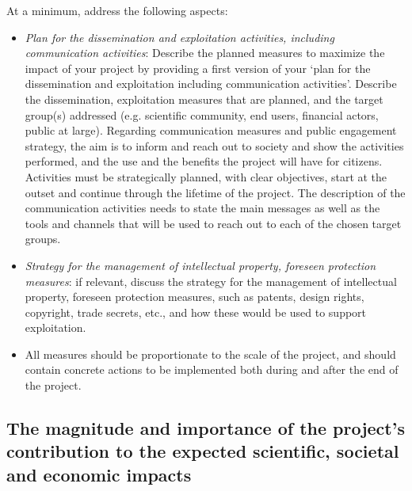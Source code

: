 \documentclass[12pt,draftproposal]{msca-pf}
\begin{document}
At a minimum, address the following aspects:

\begin{itemize}
    \item \emph{Plan for the dissemination and exploitation activities, including
    communication activities}\footnotemark{}: Describe the planned measures to
    maximize the impact of your project by providing a first version of your ‘plan
    for the dissemination and exploitation including communication activities’.
    Describe the dissemination, exploitation measures that are planned, and the target
    group(s) addressed (e.g. scientific community, end users, financial actors,
    public at large). Regarding communication measures and public engagement
    strategy, the aim is to inform and reach out to society and show the activities
    performed, and the use and the benefits the project will have for citizens.
    Activities must be strategically planned, with clear objectives, start at the
    outset and continue through the lifetime of the project. The description of
    the communication activities needs to state the main messages as well as the
    tools and channels that will be used to reach out to each of the chosen target
    groups.


    \item \emph{Strategy for the management of intellectual property, foreseen
    protection measures}: if relevant, discuss the strategy for the management
    of intellectual property, foreseen protection measures, such as patents,
    design rights, copyright, trade secrets, etc., and how these would be used
    to support exploitation.

    \item All measures should be proportionate to the scale of the project, and
    should contain concrete actions to be implemented both during and after the
    end of the project.
\end{itemize}

\subsection{The magnitude and importance of the project’s contribution to the
    expected scientific, societal and economic impacts}
\label{ssc:impact:future}
\end{document}
